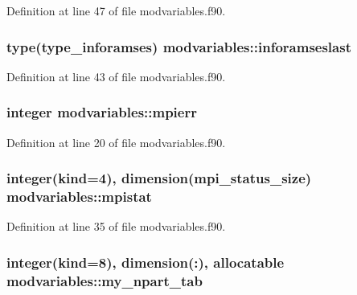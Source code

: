 Definition at line 47 of file modvariables.\+f90.

\subsubsection[{\texorpdfstring{inforamseslast}{inforamseslast}}]{\setlength{\rightskip}{0pt plus 5cm}type({\bf type\+\_\+inforamses}) modvariables\+::inforamseslast}\hypertarget{namespacemodvariables_a0640750979390f0e918c322d27b0bf74}{}\label{namespacemodvariables_a0640750979390f0e918c322d27b0bf74}


Definition at line 43 of file modvariables.\+f90.

\subsubsection[{\texorpdfstring{mpierr}{mpierr}}]{\setlength{\rightskip}{0pt plus 5cm}integer modvariables\+::mpierr}\hypertarget{namespacemodvariables_ab580e2bdf8eff875402911526f873de2}{}\label{namespacemodvariables_ab580e2bdf8eff875402911526f873de2}


Definition at line 20 of file modvariables.\+f90.

\subsubsection[{\texorpdfstring{mpistat}{mpistat}}]{\setlength{\rightskip}{0pt plus 5cm}integer(kind=4), dimension(mpi\+\_\+status\+\_\+size) modvariables\+::mpistat}\hypertarget{namespacemodvariables_af6d0e7b2912dcb50b21940d5f8658be4}{}\label{namespacemodvariables_af6d0e7b2912dcb50b21940d5f8658be4}


Definition at line 35 of file modvariables.\+f90.

\subsubsection[{\texorpdfstring{my\+\_\+npart\+\_\+tab}{my_npart_tab}}]{\setlength{\rightskip}{0pt plus 5cm}integer(kind=8), dimension(\+:), allocatable modvariables\+::my\+\_\+npart\+\_\+tab}\hypertarget{namespacemodvariables_a64ba80f97884e73fedc7341570a93bd9}{}\label{namespacemodvariables_a64ba80f97884e73fedc7341570a93bd9}


